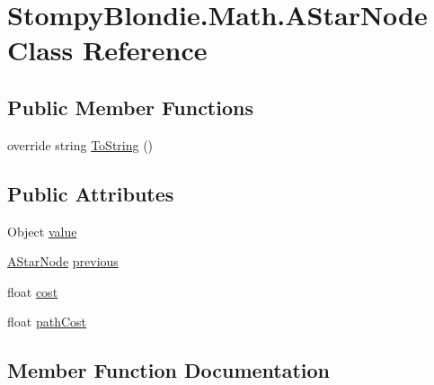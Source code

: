 \hypertarget{class_stompy_blondie_1_1_math_1_1_a_star_node}{}\section{Stompy\+Blondie.\+Math.\+A\+Star\+Node Class Reference}
\label{class_stompy_blondie_1_1_math_1_1_a_star_node}
\subsection*{Public Member Functions}
\begin{DoxyCompactItemize}
\item 
override string \mbox{\hyperlink{class_stompy_blondie_1_1_math_1_1_a_star_node_aec950ec9440e54a2b7883a2f60529126}{To\+String}} ()
\end{DoxyCompactItemize}
\subsection*{Public Attributes}
\begin{DoxyCompactItemize}
\item 
Object \mbox{\hyperlink{class_stompy_blondie_1_1_math_1_1_a_star_node_a14b61327ae92e9836a6b04f686f1ba0d}{value}}
\item 
\mbox{\hyperlink{class_stompy_blondie_1_1_math_1_1_a_star_node}{A\+Star\+Node}} \mbox{\hyperlink{class_stompy_blondie_1_1_math_1_1_a_star_node_a6662a6b1121e342f55c14609b7f160db}{previous}}
\item 
float \mbox{\hyperlink{class_stompy_blondie_1_1_math_1_1_a_star_node_a88be85813ab33cf6c852379872cfb642}{cost}}
\item 
float \mbox{\hyperlink{class_stompy_blondie_1_1_math_1_1_a_star_node_a15610dea8c44d1798c15777dc7853502}{path\+Cost}}
\end{DoxyCompactItemize}


\subsection{Member Function Documentation}
\mbox{\label{class_stompy_blondie_1_1_math_1_1_a_star_node_aec950ec9440e54a2b7883a2f60529126}} 
